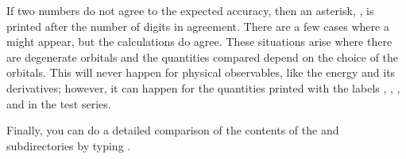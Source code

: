   If two numbers do not agree to the expected accuracy, then an asterisk,
\type{*}, is printed after the number of digits in agreement.  There are a
few cases where a \type{*} might appear, but the calculations do agree.
These situations arise where there are degenerate orbitals and the
quantities compared depend on the choice of the orbitals.  This will never
happen for physical observables, like the energy and its derivatives;
however, it can happen for the quantities printed with the labels
, , , and  in the 
test series.


  Finally, you can do a detailed comparison of the contents of the
 and  subdirectories by typing .

